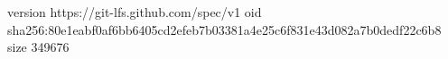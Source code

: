 version https://git-lfs.github.com/spec/v1
oid sha256:80e1eabf0af6bb6405cd2efeb7b03381a4e25c6f831e43d082a7b0dedf22c6b8
size 349676
